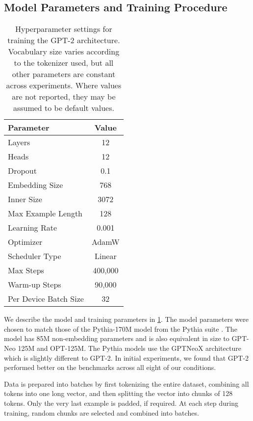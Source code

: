 \subsection{Model Parameters and Training Procedure}

\begin{table}[ht!]
    \centering
    \small
    \begin{tabular}{lc}
    \toprule
         Parameter & Value\\
    \midrule
         Layers & 12 \\
         Heads & 12 \\
         Dropout & 0.1 \\
         Embedding Size & 768 \\
         Inner Size & 3072 \\
         Max Example Length & 128 \\
         Learning Rate & 0.001 \\
         Optimizer & AdamW \\
         Scheduler Type & Linear\\
         Max Steps & 400,000 \\
         Warm-up Steps & 90,000\\
         Per Device Batch Size & 32 \\
    \bottomrule
    \end{tabular}
    \caption{Hyperparameter settings for training the GPT-2 architecture. Vocabulary size varies according to the tokenizer used, but all other parameters are constant across experiments. Where values are not reported, they may be assumed to be default values.}
    \label{table:baseline_hyperparams}
\end{table}

We describe the model and training parameters in \cref{table:baseline_hyperparams}. The model parameters were chosen to match those of the Pythia-170M model from the Pythia suite \citep{biderman2023pythia}. The model has 85M non-embedding parameters and is also equivalent in size to GPT-Neo 125M and OPT-125M. The Pythia models use the GPTNeoX architecture which is slightly different to GPT-2. In initial experiments, we found that GPT-2 performed better on the benchmarks across all eight of our conditions. 

Data is prepared into batches by first tokenizing the entire dataset, combining all tokens into one long vector, and then splitting the vector into chunks of 128 tokens. Only the very last example is padded, if required. At each step during training, random chunks are selected and combined into batches. 

